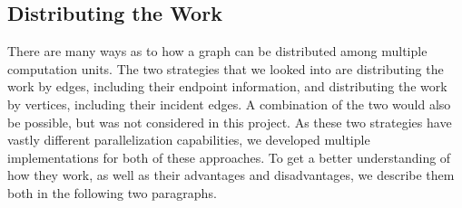 \documentclass[letterpaper]{article}
\begin{document}
\subsection{Distributing the Work}
There are many ways as to how a graph can be distributed among multiple computation units. The two strategies that we
looked into are distributing the work by edges, including their endpoint information, and distributing the work by
vertices, including their incident edges. A combination of the two would also be possible, but was not considered in
this project. As these two strategies have vastly different parallelization capabilities, we developed multiple
implementations for both of these approaches. To get a better understanding of how they work, as well as their
advantages and disadvantages, we describe them both in the following two paragraphs.
\end{document}
